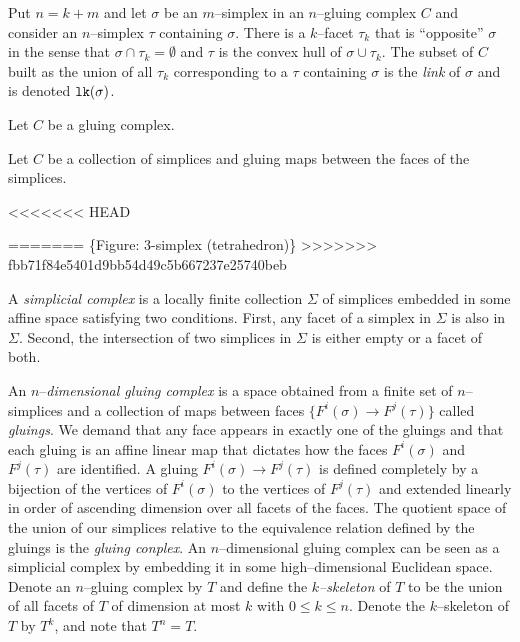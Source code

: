 Put $n=k+m$ and let $\sigma$ be an $m$--simplex in an $n$--gluing complex $C$ and consider an $n$--simplex $\tau$ containing $\sigma$.
There is a $k$--facet $\tau_k$ that is ``opposite'' $\sigma$ in the sense that $\sigma\cap\tau_k=\emptyset$ and $\tau$ is the convex hull of $\sigma\cup\tau_k$.
The subset of $C$ built as the union of all $\tau_k$ corresponding to a $\tau$ containing $\sigma$ is the \emph{link} of $\sigma$ and is denoted $\texttt{lk}(\sigma)$.

Let $C$ be a gluing complex.



Let $C$ be a collection of simplices and gluing maps between the faces of the simplices.

<<<<<<< HEAD















=======
\{Figure: 3-simplex (tetrahedron)\}
>>>>>>> fbb71f84e5401d9bb54d49c5b667237e25740beb

A \emph{simplicial complex} is a locally finite collection $\Sigma$ of simplices embedded in some affine space satisfying two conditions.
First, any facet of a simplex in $\Sigma$ is also in $\Sigma$.
Second, the intersection of two simplices in $\Sigma$ is either empty or a facet of both.

An $n$--\emph{dimensional gluing complex} is a space obtained from a finite set of $n$--simplices and a collection of maps between faces $\{F^i(\sigma)\to F^j(\tau)\}$ called \emph{gluings}.
We demand that any face appears in exactly one of the gluings and that each gluing is an affine linear map that dictates how the faces $F^i(\sigma)$ and $F^j(\tau)$ are identified.
A gluing $F^i(\sigma)\to F^j(\tau)$ is defined completely by a bijection of the vertices of $F^i(\sigma)$ to the vertices of $F^j(\tau)$ and extended linearly in order of ascending dimension over all facets of the faces.
The quotient space of the union of our simplices relative to the equivalence relation defined by the gluings is the \emph{gluing conplex}.
An $n$--dimensional gluing complex can be seen as a simplicial complex by embedding it in some high--dimensional Euclidean space.
Denote an $n$--gluing complex by $T$ and define the \emph{$k$--skeleton} of $T$ to be the union of all facets of $T$ of dimension at most $k$ with $0\leq k\leq n$.
Denote the $k$--skeleton of $T$ by $T^k$, and note that $T^n=T$.




